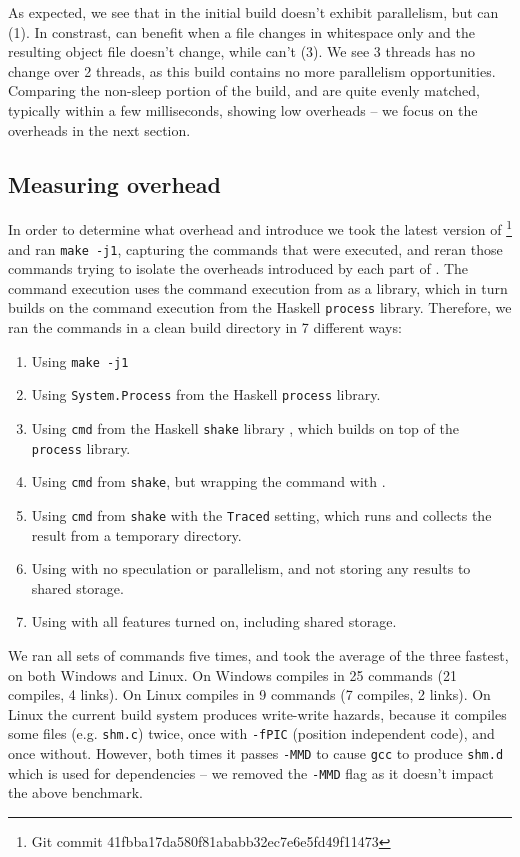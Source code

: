 As expected, we see that in the initial build \Rattle doesn't exhibit parallelism, but \Make can (1). In constrast, \Rattle can benefit when a file changes in whitespace only and the resulting object file doesn't change, while \Make can't (3). We see 3 threads has no change over 2 threads, as this build contains no more parallelism opportunities. Comparing the non-sleep portion of the build, \Make and \Rattle are quite evenly matched, typically within a few milliseconds, showing low overheads -- we focus on the overheads in the next section.

\subsection{Measuring overhead}
\label{sec:eval:overhead}

In order to determine what overhead \Rattle and \Fsatrace introduce we took the latest version of \Fsatrace\footnote{Git commit 41fbba17da580f81ababb32ec7e6e5fd49f11473} and ran \texttt{make -j1}, capturing the commands that were executed, and reran those commands trying to isolate the overheads introduced by each part of \Rattle. The \Rattle command execution uses the command execution from \Shake \cite{shake} as a library, which in turn builds on the command execution from the Haskell \texttt{process} library. Therefore, we ran the commands in a clean build directory in 7 different ways:

\begin{enumerate}
\item Using \texttt{make -j1}
\item Using \texttt{System.Process} from the Haskell \texttt{process} library.
\item Using \texttt{cmd} from the Haskell \texttt{shake} library \cite{shake}, which builds on top of the \texttt{process} library.
\item Using \texttt{cmd} from \texttt{shake}, but wrapping the command with \Fsatrace.
\item Using \texttt{cmd} from \texttt{shake} with the \texttt{Traced} setting, which runs \Fsatrace and collects the result from a temporary directory.
\item Using \Rattle with no speculation or parallelism, and not storing any results to shared storage.
\item Using \Rattle with all features turned on, including shared storage.
\end{enumerate}

We ran all sets of commands five times, and took the average of the three fastest, on both Windows and Linux. On Windows \Fsatrace compiles in 25 commands (21 compiles, 4 links). On Linux \Fsatrace compiles in 9 commands (7 compiles, 2 links). On Linux the current build system produces write-write hazards, because it compiles some files (e.g. \texttt{shm.c}) twice, once with \texttt{-fPIC} (position independent code), and once without. However, both times it passes \texttt{-MMD} to cause \texttt{gcc} to produce \texttt{shm.d} which is used for dependencies -- we removed the \texttt{-MMD} flag as it doesn't impact the above benchmark.


